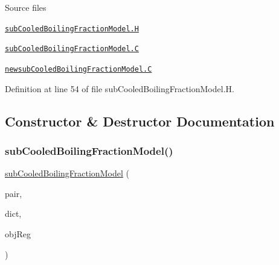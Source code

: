 \begin{DoxyParagraph}{Source files}

\begin{DoxyItemize}
\item \href{../../../home/carlo/data/GeN-Foam/GeN-Foam_ffn/GeN-Foam/GeN-Foam/classes/thermalHydraulics/src/physicsModels/heatTransferModels/FSHeatTransferCoefficientModels/subModels/subCooledBoilingFractionModels/subCooledBoilingFractionModel.H}{\tt sub\+Cooled\+Boiling\+Fraction\+Model.\+H} 
\item \href{../../../home/carlo/data/GeN-Foam/GeN-Foam_ffn/GeN-Foam/GeN-Foam/classes/thermalHydraulics/src/physicsModels/heatTransferModels/FSHeatTransferCoefficientModels/subModels/subCooledBoilingFractionModels/subCooledBoilingFractionModel.C}{\tt sub\+Cooled\+Boiling\+Fraction\+Model.\+C} 
\item \href{../../../home/carlo/data/GeN-Foam/GeN-Foam_ffn/GeN-Foam/GeN-Foam/classes/thermalHydraulics/src/physicsModels/heatTransferModels/FSHeatTransferCoefficientModels/subModels/subCooledBoilingFractionModels/newsubCooledBoilingFractionModel.C}{\tt newsub\+Cooled\+Boiling\+Fraction\+Model.\+C} 
\end{DoxyItemize}
\end{DoxyParagraph}


Definition at line 54 of file sub\+Cooled\+Boiling\+Fraction\+Model.\+H.



\subsection{Constructor \& Destructor Documentation}
\mbox{\label{classFoam_1_1subCooledBoilingFractionModel_abfad2060d2d89d8a0784c2f9f80eb4a3}} 
\subsubsection{\texorpdfstring{sub\+Cooled\+Boiling\+Fraction\+Model()}{subCooledBoilingFractionModel()}}
{\footnotesize\ttfamily \hyperlink{classFoam_1_1subCooledBoilingFractionModel}{sub\+Cooled\+Boiling\+Fraction\+Model} (\begin{DoxyParamCaption}\item[{const \hyperlink{classFoam_1_1FSPair}{F\+S\+Pair} \&}]{pair,  }\item[{const dictionary \&}]{dict,  }\item[{const object\+Registry \&}]{obj\+Reg }\end{DoxyParamCaption})}



